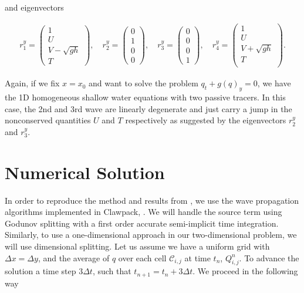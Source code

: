 \documentclass[12pt]{article}
\begin{document}
and eigenvectors

\begin{align}
    r^y_1=
    \begin{pmatrix} 
        1\\
        U\\
        V-\sqrt{gh}\\
        T
    \end{pmatrix},
    \quad
    r^y_2=
    \begin{pmatrix} 
        0\\
        1\\
        0\\
        0
    \end{pmatrix},
    \quad
    r^y_3=
    \begin{pmatrix} 
        0\\
        0\\
        0\\
        1
    \end{pmatrix},
    \quad
    r^y_4=
    \begin{pmatrix} 
        1\\
        U\\
        V+\sqrt{gh}\\
        T\\
    \end{pmatrix}.
\end{align}

Again, if we fix $x=x_0$ and want to solve the problem $q_t+g(q)_y=0$, we have the 1D homogeneous shallow water equations with two passive tracers. 
In this case, the 2nd and 3rd wave are linearly degenerate and just carry a jump in the nonconserved quantities $U$ and $T$ respectively as suggested by the eigenvectors $r^y_2$ and $r^y_3$.

\section{Numerical Solution}
            
In order to reproduce the method and results from \cite{costa2005numerical}, we use the wave propagation algorithms implemented in Clawpack, \cite{clawpack}. 
We will handle the source term using Godunov splitting with a first order accurate semi-implicit time integration. Similarly, to use a one-dimensional approach in our two-dimensional problem, we will use dimensional splitting. Let us assume we have a uniform grid with $\Delta x= \Delta y$, and  the average of $q$ over each cell $\mathcal{C}_{i,j}$ at time $t_n$, $Q^n_{i,j}$. To advance the solution a time step $3\Delta t$, such that $t_{n+1}=t_n+3\Delta t$. We proceed in the following way
\end{document}

